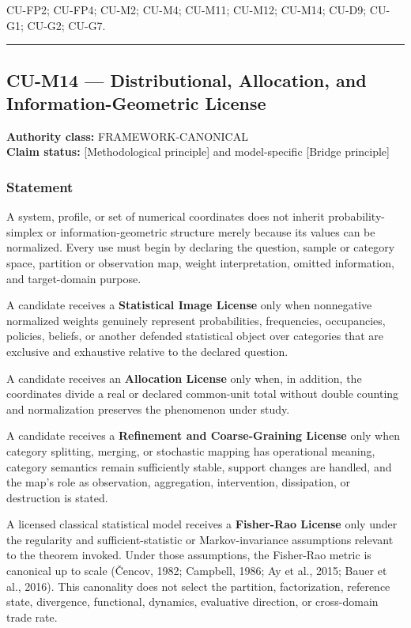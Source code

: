 \documentclass[
  11pt,
]{article}
\begin{document}
CU-FP2; CU-FP4; CU-M2; CU-M4; CU-M11; CU-M12; CU-M14; CU-D9; CU-G1;
CU-G2; CU-G7.

\begin{center}\rule{0.5\linewidth}{0.5pt}\end{center}

\subsection{CU-M14 --- Distributional, Allocation, and
Information-Geometric
License}\label{cu-m14-distributional-allocation-and-information-geometric-license}

\textbf{Authority class:} FRAMEWORK-CANONICAL\\
\textbf{Claim status:} {[}Methodological principle{]} and model-specific
{[}Bridge principle{]}

\subsubsection{Statement}\label{statement-22}

A system, profile, or set of numerical coordinates does not inherit
probability-simplex or information-geometric structure merely because
its values can be normalized. Every use must begin by declaring the
question, sample or category space, partition or observation map, weight
interpretation, omitted information, and target-domain purpose.

A candidate receives a \textbf{Statistical Image License} only when
nonnegative normalized weights genuinely represent probabilities,
frequencies, occupancies, policies, beliefs, or another defended
statistical object over categories that are exclusive and exhaustive
relative to the declared question.

A candidate receives an \textbf{Allocation License} only when, in
addition, the coordinates divide a real or declared common-unit total
without double counting and normalization preserves the phenomenon under
study.

A candidate receives a \textbf{Refinement and Coarse-Graining License}
only when category splitting, merging, or stochastic mapping has
operational meaning, category semantics remain sufficiently stable,
support changes are handled, and the map's role as observation,
aggregation, intervention, dissipation, or destruction is stated.

A licensed classical statistical model receives a \textbf{Fisher-Rao
License} only under the regularity and sufficient-statistic or
Markov-invariance assumptions relevant to the theorem invoked. Under
those assumptions, the Fisher-Rao metric is canonical up to scale
(Čencov, 1982; Campbell, 1986; Ay et al., 2015; Bauer et al., 2016).
This canonality does not select the partition, factorization, reference
state, divergence, functional, dynamics, evaluative direction, or
cross-domain trade rate.
\end{document}
